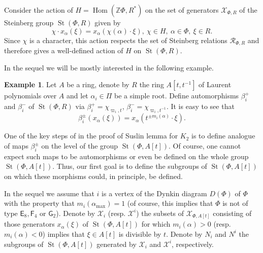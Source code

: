 \documentclass[oneside, 10pt]{amsart}
\DeclareMathOperator{\St}{St}
\DeclareMathOperator{\Hom}{Hom}
\newcommand{\rE}{\mathsf{E}}
\newcommand{\rF}{\mathsf{F}}
\newcommand{\rG}{\mathsf{G}}
\newcommand{\ZZ}{\mathbb{Z}}
\numberwithin{equation}{section}
\numberwithin{lemma}{section}
\theoremstyle{definition}
\newtheorem{example}[lemma]{Example}
\theoremstyle{remark}
\begin{document}
Consider the action of $H=\Hom(\ZZ \Phi, R^*)$ on the set of generators $\mathcal{X}_{\Phi, R}$ of the Steinberg group $\St(\Phi, R)$ given by
\begin{equation} \chi \cdot x_\alpha(\xi) = x_\alpha(\chi(\alpha) \cdot \xi),\ \chi \in H,\ \alpha\in \Phi,\ \xi \in R. \end{equation}
Since $\chi$ is a character, this action respects the set of Steinberg relations $\mathcal{R}_{\Phi, R}$ and therefore gives a well-defined action of $H$ on $\St(\Phi, R)$.

In the sequel we will be mostly interested in the following example.
\begin{example}
Let $A$ be a ring, denote by $R$ the ring $A[t, t^{-1}]$ of Laurent polynomials over $A$ and let $\alpha_i \in \Pi$ be a simple root.
Define automorphisms $\beta_i^+$ and $\beta_i^-$ of $\St(\Phi, R)$ via $\beta_i^+ = \chi_{\varpi_i, t}$, $\beta_i^- = \chi_{\varpi_i, t^{-1}}$.
It is easy to see that
\begin{equation}\label{eq:sigma_act} \beta_i^\pm(x_\alpha(\xi)) = x_\alpha(t^{\pm m_i(\alpha)} \cdot \xi).\end{equation}
\end{example}

One of the key steps of in the proof of Suslin lemma for $K_2$ is to define analogue of maps $\beta_i^\pm$ on the level of the group $\St(\Phi, A[t])$.
Of course, one cannot expect such maps to be automorphisms or even be defined on the whole group $\St(\Phi, A[t])$.
Thus, our first goal is to define the subgroups of $\St(\Phi, A[t])$ on which these morphisms could, in principle, be defined.

In the sequel we assume that $i$ is a vertex of the Dynkin diagram $D(\Phi)$ of $\Phi$ with the property that $m_i(\alpha_{\max})=1$ (of course, this implies that $\Phi$ is not of type $\rE_8, \rF_4$ or $\rG_2$).
Denote by $\mathcal{X}_i$ (resp. $\mathcal{X}^i$) the subsets of $\mathcal{X}_{\Phi, A[t]}$ consisting of those generators $x_{\alpha}(\xi)$ of $\St(\Phi, A[t])$ for which 
$m_i(\alpha) > 0$ (resp. $m_i(\alpha)<0$) implies that $\xi \in A[t]$ is divisible by $t$.
Denote by $N_i$ and $N^i$ the subgroups of $\St(\Phi, A[t])$ generated by $\mathcal{X}_i$ and $\mathcal{X}^i$, respectively.
\end{document}
